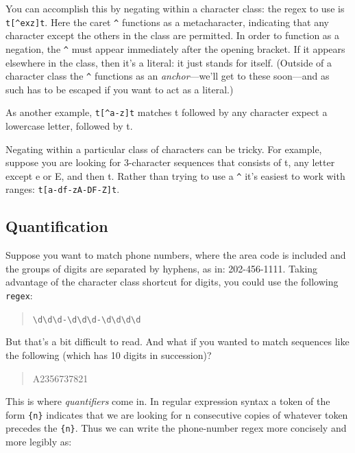 \documentclass[]{book}
\theoremstyle{definition}
\theoremstyle{definition}
\theoremstyle{remark}
\begin{document}
{You can accomplish this by negating within a character class: the regex
to use is \texttt{t{[}\^{}exz{]}t}. Here the caret \texttt{\^{}}
functions as a metacharacter, indicating that any character except the
others in the class are permitted. In order to function as a negation,
the \texttt{\^{}} must appear immediately after the opening bracket. If
it appears elsewhere in the class, then it's a literal: it just stands
for itself. (Outside of a character class the \texttt{\^{}} functions as
an \emph{anchor}---we'll get to these soon---and as such has to be
escaped if you want to act as a literal.)

As another example, \texttt{t{[}\^{}a-z{]}t} matches t followed by any
character expect a lowercase letter, followed by t.

Negating within a particular class of characters can be tricky. For
example, suppose you are looking for 3-character sequences that consists
of t, any letter except e or E, and then t. Rather than trying to use a
\texttt{\^{}} it's easiest to work with ranges:
\texttt{t{[}a-df-zA-DF-Z{]}t}.

\subsection{Quantification}\label{quantification}

Suppose you want to match phone numbers, where the area code is included
and the groups of digits are separated by hyphens, as in: 202-456-1111.
Taking advantage of the character class shortcut for digits, you could
use the following \texttt{regex}:

\begin{quote}
\texttt{\textbackslash{}d\textbackslash{}d\textbackslash{}d-\textbackslash{}d\textbackslash{}d\textbackslash{}d-\textbackslash{}d\textbackslash{}d\textbackslash{}d\textbackslash{}d}
\end{quote}

But that's a bit difficult to read. And what if you wanted to match
sequences like the following (which has 10 digits in succession)?

\begin{quote}
A2356737821
\end{quote}

This is where \emph{quantifiers}  come in. In regular
expression syntax a token of the form \texttt{\{n\}} indicates that we
are looking for n consecutive copies of whatever token precedes the
\texttt{\{n\}}. Thus we can write the phone-number regex more concisely
and more legibly as:

}
\end{document}

